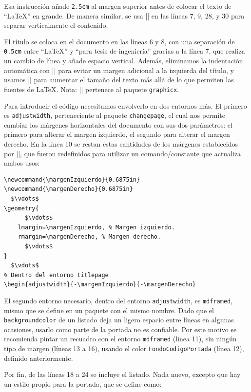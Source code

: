 Esa instrucción añade \texttt{2.5cm} al margen superior antes de colocar el texto de ``\LaTeX'' en grande. De manera similar, se usa |\vspace| en las líneas 7, 9, 28, y 30 para separar verticalmente el contenido.

El título se coloca en el documento en las líneas 6 y 8, con una separación de \texttt{0.5cm} entre ``\LaTeX'' y ``para tesis de ingeniería'' gracias a la línea 7, que realiza un cambio de línea y añade espacio vertical. Además, eliminamos la indentación automática con |\noindent| para evitar un margen adicional a la izquierda del título, y usamos |\scalebox| para aumentar el tamaño del texto más allá de lo que permiten las fuentes de \LaTeX{}. Nota: |\scalebox| pertenece al paquete \texttt{graphicx}.

Para introducir el código necesitamos envolverlo en dos entornos más. El primero es \texttt{adjustwidth}, perteneciente al paquete \texttt{changepage}, el cual nos permite cambiar los márgenes horizontales del documento con sus dos parámetros: el primero para alterar el margen izquierdo, el segundo para alterar el margen derecho. En la línea 10 se restan estas cantidades de los márgenes establecidos por |\geometry|, que fueron redefinidos para utilizar un comando/constante que actualiza ambos usos:

\begin{lstlisting}[style=latex]
\newcommand{\margenIzquierdo}{0.6875in}
\newcommand{\margenDerecho}{0.6875in}
  $\vdots$
\geometry{
      $\vdots$
    lmargin=\margenIzquierdo, % Margen izquierdo.
    rmargin=\margenDerecho, % Margen derecho.
      $\vdots$
}
  $\vdots$
% Dentro del entorno titlepage
\begin{adjustwidth}{-\margenIzquierdo}{-\margenDerecho}
\end{lstlisting}

El segundo entorno necesario, dentro del entorno \texttt{adjustwidth}, es \texttt{mdframed}, mismo que se define en un paquete con el mismo nombre. Dado que el \texttt{backgroundcolor} de un listado deja un ligero espacio entre líneas en algunas ocasiones, usarlo como parte de la portada no es confiable. Por este motivo se recomienda pintar un recuadro con el entorno \texttt{mdframed} (línea 11), sin ningún tipo de margen (líneas 13 a 16), usando el color \texttt{FondoCodigoPortada} (línea 12), definido anteriormente.

Por fin, de las líneas 18 a 24 se incluye el listado. Nada nuevo, excepto que hay un estilo propio para la portada, que se define como:


